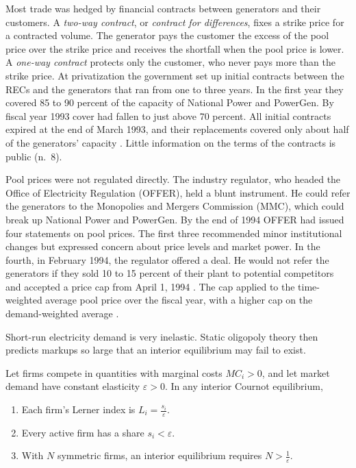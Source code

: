 Most trade was hedged by financial contracts between generators and their customers. A \emph{two-way contract}, or
\emph{contract for differences}, fixes a strike price for a contracted volume. The generator pays the customer the
excess of the pool price over the strike price and receives the shortfall when the pool price is lower. A
\emph{one-way contract} protects only the customer, who never pays more than the strike price. At privatization the
government set up initial contracts between the RECs and the generators that ran from one to three years. In the first
year they covered 85 to 90 percent of the capacity of National Power and PowerGen. By fiscal year 1993 cover had fallen
to just above 70 percent. All initial contracts expired at the end of March 1993, and their replacements covered only
about half of the generators' capacity \citep[p.~808]{Wolfram1999}. Little information on the terms of the contracts is
public (n.~8).

Pool prices were not regulated directly. The industry regulator, who headed the Office of Electricity Regulation
(OFFER), held a blunt instrument. He could refer the generators to the Monopolies and Mergers Commission (MMC), which
could break up National Power and PowerGen. By the end of 1994 OFFER had issued four statements on pool prices. The
first three recommended minor institutional changes but expressed concern about price levels and market power. In the
fourth, in February 1994, the regulator offered a deal. He would not refer the generators if they sold 10 to 15 percent
of their plant to potential competitors and accepted a price cap from April 1, 1994 \citep[p.~808]{Wolfram1999}. The cap
applied to the
time-weighted average pool price over the fiscal year, with a higher cap on the demand-weighted average
\citep[p.~818]{Wolfram1999}.

Short-run electricity demand is very inelastic. Static oligopoly theory then predicts markups so large that an interior
equilibrium may fail to exist.

\begin{proposition}\label{prop:03-no-interior-cournot}
Let firms compete in quantities with marginal costs $MC_i > 0$, and let market demand have constant elasticity
$\varepsilon > 0$. In any interior Cournot equilibrium,
\begin{enumerate}[label=(\roman*)]
\item Each firm's Lerner index is $L_i = \frac{s_i}{\varepsilon}$.
\item Every active firm has a share $s_i < \varepsilon$.
\item With $N$ symmetric firms, an interior equilibrium requires $N > \frac{1}{\varepsilon}$.
\end{enumerate}
\end{proposition}

